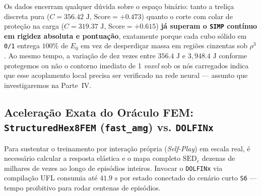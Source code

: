 \documentclass[11pt,a4paper]{article}
\begin{document}
Os dados encerram qualquer dúvida sobre o espaço binário: tanto a treliça discreta pura ($C = 356.42\text{ J}$, $\text{Score} = +0.473$) quanto o corte com colar de proteção na carga ($C = 319.37\text{ J}$, $\text{Score} = +0.615$) \textbf{já superam o \texttt{SIMP} contínuo em rigidez absoluta e pontuação}, exatamente porque cada cubo sólido em \texttt{0/1} entrega $100\%$ de $E_0$ em vez de desperdiçar massa em regiões cinzentas sob $\rho^3$. Ao mesmo tempo, a variação de dez vezes entre $356.4\text{ J}$ e $3{,}948.4\text{ J}$ conforme protegemos ou não o contorno imediato de 1 \emph{voxel} sob os nós carregados indica que esse acoplamento local precisa ser verificado na rede neural — assunto que investigaremos na Parte~IV.

\subsection{Aceleração Exata do Oráculo FEM: \texttt{StructuredHex8FEM} (\texttt{fast\_amg}) vs. \texttt{DOLFINx}}

Para sustentar o treinamento por interação própria (\emph{Self-Play}) em escala real, é necessário calcular a resposta elástica e o mapa completo $\mathrm{SED}_e$ dezenas de milhares de vezes ao longo de episódios inteiros. Invocar o \texttt{DOLFINx} via compilação UFL consumia até \textbf{$41.9\text{ s}$} por estado conectado do cenário curto \texttt{S6} — tempo proibitivo para rodar centenas de episódios.
\end{document}
